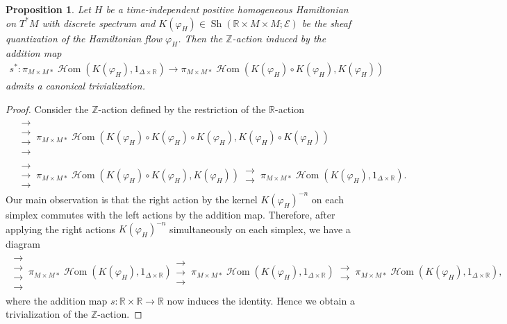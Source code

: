 \documentclass[11pt]{amsart}
\numberwithin{equation}{section}
\theoremstyle{plain}
\newtheorem{Prop}[prop]{Proposition}
\theoremstyle{definition}
\theoremstyle{remark}
\newcommand{\bZ} { {\mathbb{Z}}}
\newcommand{\bR} { {\mathbb{R}}}
\newcommand{\cE} { {\mathcal{E}}}
\newcommand{\Sh} { {\operatorname{Sh}}}
\newcommand\sHom{\operatorname{\mathscr{H}om}}
\begin{document}
\begin{Prop}\label{prop: trivial Z action}
Let $H$ be a time-independent positive homogeneous Hamiltonian on $T^*M$ with discrete spectrum and $K(\varphi_H) \in \Sh(\bR \times M \times M; \cE)$ be the sheaf quantization of the Hamiltonian flow $\varphi_H$. Then the $\bZ$-action induced by the addition map
\begin{align*}
s^*: \pi_{M\times M*}\sHom(K(\varphi_H), 1_{\Delta\times \bR}) \to \pi_{M\times M*}\sHom(K(\varphi_H) \circ K(\varphi_H), K(\varphi_H))
\end{align*}
admits a canonical trivialization.
\end{Prop}
\begin{proof}
Consider the $\bZ$-action defined by the restriction of the $\bR$-action
\begin{align*}
&\substack{\longrightarrow \\[-0.8em] \longrightarrow \\[-0.8em] \longrightarrow \\[-0.8em] \longrightarrow}\,\pi_{M\times M*}\sHom(K(\varphi_H) \circ K(\varphi_H) \circ K(\varphi_H), K(\varphi_H) \circ K(\varphi_H)) \\
&\substack{\longrightarrow \\[-0.8em] \longrightarrow \\[-0.8em] \longrightarrow}\,\pi_{M\times M*}\sHom(K(\varphi_H) \circ K(\varphi_H), K(\varphi_H)) \,\substack{\longrightarrow \\[-0.8em] \longrightarrow}\, \pi_{M\times M*}\sHom(K(\varphi_H), 1_{\Delta\times\bR}).
\end{align*}
Our main observation is that the right action by the kernel $K(\varphi_H)^{- n}$ on each simplex commutes with the left actions by the addition map. Therefore, after applying the right actions $K(\varphi_H)^{- n}$ simultaneously on each simplex, we have a diagram
\begin{align*}
\substack{\longrightarrow \\[-0.8em] \longrightarrow \\[-0.8em] \longrightarrow \\[-0.8em] \longrightarrow}\,\pi_{M\times M*}\sHom(K(\varphi_H), 1_{\Delta\times \bR}) \substack{\longrightarrow \\[-0.8em] \longrightarrow \\[-0.8em] \longrightarrow}\,\pi_{M\times M*}\sHom(K(\varphi_H), 1_{\Delta\times \bR}) \,\substack{\longrightarrow \\[-0.8em] \longrightarrow}\, \pi_{M\times M*}\sHom(K(\varphi_H), 1_{\Delta\times\bR}),
\end{align*}
where the addition map $s: \bR \times \bR \to \bR$ now induces the identity. Hence we obtain a trivialization of the $\bZ$-action.
\end{proof}
\end{document}
